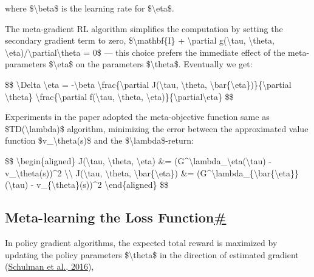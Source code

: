 where \$\textbackslash beta\$ is the learning rate for \$\textbackslash eta\$.

The meta-gradient RL algorithm simplifies the computation by setting the secondary gradient term to zero, \$\textbackslash mathbf\{I\} + \textbackslash partial g(\textbackslash tau, \textbackslash theta, \textbackslash eta)/\textbackslash partial\textbackslash theta = 0\$ --- this choice prefers the immediate effect of the meta-parameters \$\textbackslash eta\$ on the parameters \$\textbackslash theta\$. Eventually we get:

\$\$ \textbackslash Delta \textbackslash eta = -\textbackslash beta \textbackslash frac\{\textbackslash partial J(\textbackslash tau\textquotesingle, \textbackslash theta\textquotesingle, \textbackslash bar\{\textbackslash eta\})\}\{\textbackslash partial \textbackslash theta\textquotesingle\} \textbackslash frac\{\textbackslash partial f(\textbackslash tau, \textbackslash theta, \textbackslash eta)\}\{\textbackslash partial\textbackslash eta\} \$\$

Experiments in the paper adopted the meta-objective function same as \$TD(\textbackslash lambda)\$ algorithm, minimizing the error between the approximated value function \$v\_\textbackslash theta(s)\$ and the \$\textbackslash lambda\$-return:

\$\$ \textbackslash begin\{aligned\} J(\textbackslash tau, \textbackslash theta, \textbackslash eta) \&= (G\^{}\textbackslash lambda\_\textbackslash eta(\textbackslash tau) - v\_\textbackslash theta(s))\^{}2 \textbackslash\textbackslash{} J(\textbackslash tau\textquotesingle, \textbackslash theta\textquotesingle, \textbackslash bar\{\textbackslash eta\}) \&= (G\^{}\textbackslash lambda\_\{\textbackslash bar\{\textbackslash eta\}\}(\textbackslash tau\textquotesingle) - v\_\{\textbackslash theta\textquotesingle\}(s\textquotesingle))\^{}2 \textbackslash end\{aligned\} \$\$

\subsection{\texorpdfstring{Meta-learning the Loss Function\hyperref[meta-learning-the-loss-function]{\#}}{Meta-learning the Loss Function\#}}\label{meta-learning-the-loss-function}

In policy gradient algorithms, the expected total reward is maximized by updating the policy parameters \$\textbackslash theta\$ in the direction of estimated gradient (\href{https://arxiv.org/abs/1506.02438}{Schulman et al., 2016}),

